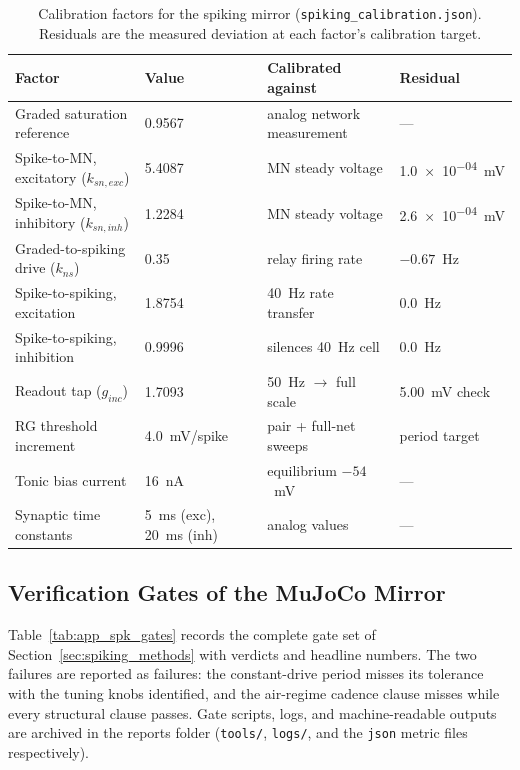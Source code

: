 \begin{table}[htbp]
\caption{Calibration factors for the spiking mirror (\texttt{spiking\_calibration.json}). Residuals are the measured deviation at each factor's calibration target.}
\label{tab:app_spk_cal}
\begin{tabular}{@{}llll@{}}
\toprule
\textbf{Factor} & \textbf{Value} & \textbf{Calibrated against} & \textbf{Residual} \\
\midrule
Graded saturation reference & 0.9567 & analog network measurement & --- \\
Spike-to-MN, excitatory ($k_{sn,exc}$) & 5.4087 & MN steady voltage & \qty{1.0e-04}{\mV} \\
Spike-to-MN, inhibitory ($k_{sn,inh}$) & 1.2284 & MN steady voltage & \qty{2.6e-04}{\mV} \\
Graded-to-spiking drive ($k_{ns}$) & 0.35 & relay firing rate & $-0.67$~Hz \\
Spike-to-spiking, excitation & 1.8754 & \qty{40}{\hertz} rate transfer & \qty{0.0}{\hertz} \\
Spike-to-spiking, inhibition & 0.9996 & silences \qty{40}{\hertz} cell & \qty{0.0}{\hertz} \\
Readout tap ($g_{inc}$) & 1.7093 & \qty{50}{\hertz} $\to$ full scale & \qty{5.00}{\mV} check \\
RG threshold increment & 4.0~mV/spike & pair + full-net sweeps & period target \\
Tonic bias current & 16~nA & equilibrium $-54$~mV & --- \\
Synaptic time constants & 5~ms (exc), 20~ms (inh) & analog values & --- \\
\bottomrule
\end{tabular}
\end{table}

\subsection{Verification Gates of the MuJoCo Mirror}

Table~\ref{tab:app_spk_gates} records the complete gate set of Section~\ref{sec:spiking_methods} with verdicts and headline numbers. The two failures are reported as failures: the constant-drive period misses its tolerance with the tuning knobs identified, and the air-regime cadence clause misses while every structural clause passes. Gate scripts, logs, and machine-readable outputs are archived in the reports folder (\texttt{tools/}, \texttt{logs/}, and the \texttt{json} metric files respectively).

